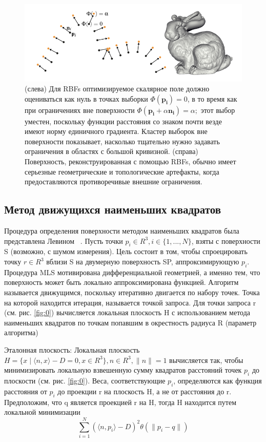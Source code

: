 \begin{figure}[h]
    \centering
    \includegraphics[scale=0.5]{images/4.png}
    \caption{(слева) Для RBFs оптимизируемое скалярное поле должно оцениваться как нуль в точках выборки $\Phi(\mathbf{p_i}) = 0$, в то время как при ограничениях вне поверхности $\Phi(\mathbf{p_i} + \alpha\mathbf{n_i}) = \alpha;$ этот выбор уместен, поскольку функции расстояния со знаком почти везде имеют норму единичного градиента. Кластер выборок вне поверхности показывает, насколько тщательно нужно задавать ограничения в областях с большой кривизной. (справа) Поверхность, реконструированная с помощью RBFs, обычно имеет серьезные геометрические и топологические артефакты, когда предоставляются противоречивые внешние ограничения.}
    \label{fig:4}
\end{figure}

\subsection{Метод движущихся наименьших квадратов}
Процедура определения поверхности методом наименьших квадратов была представлена Левином ~\cite{LEVIN}.
Пусть точки $p_i \in R^{3}, i \in \{1, . . . , N\}$, взяты с
поверхности S (возможно, с шумом измерения). Цель состоит в том, чтобы спроецировать точку $r \in R^{3}$ вблизи S на двумерную поверхность SP, аппроксимирующую $p_i$. Процедура MLS мотивирована дифференциальной геометрией, а именно тем, что поверхность может быть локально аппроксимирована функцией. Алгоритм называется движущимся, поскольку итеративно двигается по набору точек. Точка на которой находится итерация, называется точкой запроса. Для точки запроса r (см. рис. \ref{fig:0}) вычисляется локальная плоскость H с использованием метода наименьших квадратов по точкам попавшим в окрестность радиуса R (параметр алгоритма) 

Эталонная плоскость: 
 Локальная плоскость $ H = \{x \mid \langle n, x \rangle - D = 0, x  \in R^{3}\}, n \in R^{3},  \parallel n \parallel = 1 $ вычисляется так, чтобы минимизировать локальную взвешенную сумму квадратов расстояний точек $p_i$ до плоскости (см. рис. \ref{fig:0}). Веса, соответствующие $p_i$, определяются как функция расстояния от $p_i$ до проекции r на плоскость H, а не от расстояния до r. Предположим, что q является проекцией r на H, тогда H находится путем локальной минимизации
 \begin{equation}
     \sum_{i = 1}^{N}(\langle n, p_i \rangle - D)^{2} \theta(\parallel p_i - q \parallel)
     \label{eq:ref1}
 \end{equation}

